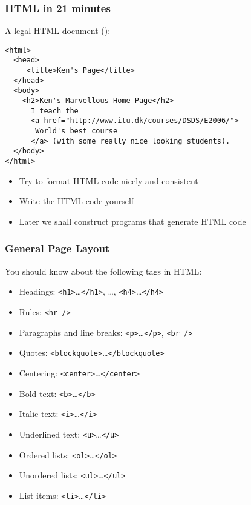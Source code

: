 \documentclass[dvipsnames]{beamer}
\begin{document}
\begin{frame}[fragile]
\frametitle{HTML in 21 minutes}

A legal HTML document ():

\begin{small}
\begin{verbatim}
<html>
  <head>
     <title>Ken's Page</title>
  </head>
  <body>
    <h2>Ken's Marvellous Home Page</h2>
      I teach the
      <a href="http://www.itu.dk/courses/DSDS/E2006/">
       World's best course
      </a> (with some really nice looking students).
  </body>
</html>
\end{verbatim}
\end{small}

\begin{itemize}
\item Try to format HTML code nicely and consistent

\item Write the HTML code yourself

\item Later we shall construct programs that generate HTML code
\end{itemize}

\end{frame}

\begin{frame}
\frametitle{General Page Layout}

You should know about the following tags in HTML:

\begin{itemize}
\item Headings: \texttt{<h1>}\ldots \texttt{</h1>}, \ldots, \texttt{<h4>}\ldots \texttt{</h4>}
\item Rules: \texttt{<hr />}
\item Paragraphs and line breaks: \texttt{<p>}\ldots \texttt{</p>},
  \texttt{<br />}
\item Quotes: \texttt{<blockquote>}\ldots \texttt{</blockquote>}
\item Centering: \texttt{<center>}\ldots \texttt{</center>}
\item Bold text: \texttt{<b>}\ldots \texttt{</b>}
\item Italic text: \texttt{<i>}\ldots \texttt{</i>}
\item Underlined text: \texttt{<u>}\ldots \texttt{</u>}
\item Ordered lists: \texttt{<ol>}\ldots \texttt{</ol>}
\item Unordered lists: \texttt{<ul>}\ldots \texttt{</ul>}
\item List items: \texttt{<li>}\ldots \texttt{</li>}
\end{itemize}
\end{frame}
\end{document}
